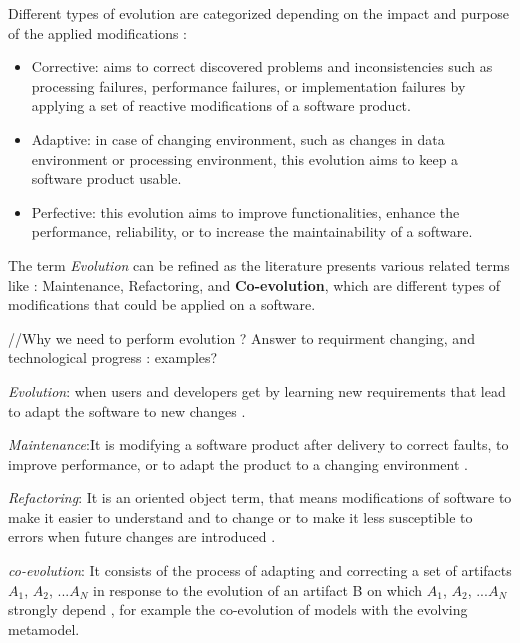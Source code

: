 Different types of evolution are categorized depending on the impact and purpose of the applied modifications \cite{lientz1980software,Swanson1976}:
\begin{itemize}
	
	\item  Corrective: aims to correct discovered problems and inconsistencies such as processing failures, performance failures, or implementation failures by applying  a set of reactive modifications of a software product.  
	
	\item  Adaptive: in case of changing environment, such as changes in data environment or processing environment, this evolution aims to keep a software product usable.
	
	\item Perfective: this evolution aims to improve functionalities, enhance the performance, reliability, or to increase the maintainability of a software.  
	
\end{itemize}

The term \textit{Evolution} can be refined as the literature presents various related terms like : Maintenance, Refactoring, and \textbf{Co-evolution}, which are different types of modifications that could be applied on a software.

//Why we need to perform evolution ?
Answer to requirment changing, and technological progress : examples?

\textit{Evolution}: when users and developers get by learning  new requirements  
that lead to adapt the software to new changes \cite{}. 

\textit{Maintenance}:It is modifying a software product after delivery to correct faults, to improve performance, or to adapt the product to a changing environment  \cite{}.

\textit{Refactoring}: It is an oriented object term, that means modifications of software to make it easier to understand and to change or to make it less susceptible to errors when future changes are introduced  \cite{}. 

\textit{co-evolution}: It consists of the process of adapting and correcting a set of artifacts $A_1$, $A_2$, ...$A_N$ in response to the evolution of an artifact B on which $A_1$, $A_2$, ...$A_N$  strongly depend  \cite{}, for example the co-evolution of models with the evolving metamodel.


